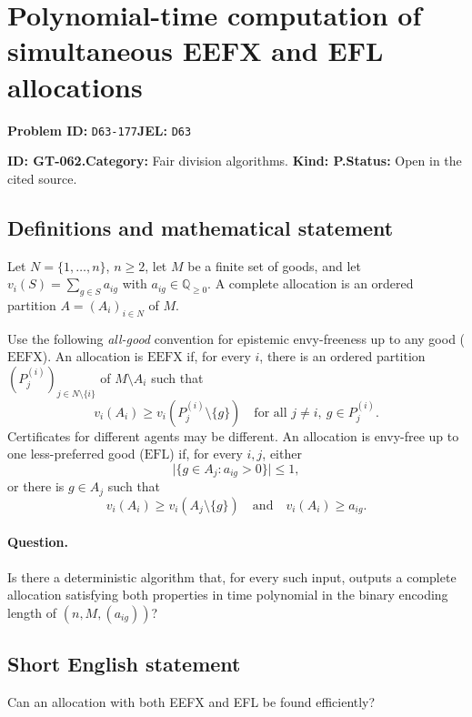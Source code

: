 \documentclass[11pt,a4paper]{article}
\begin{document}
\section*{Polynomial-time computation of simultaneous EEFX and EFL allocations}
\textbf{Problem ID:} \texttt{D63-177}\quad \textbf{JEL:} \texttt{D63}\par
\label{problem:OP-0192}
\label{game:GT-062}
{\sffamily\small\color{muted}
\noindent\textbf{ID: GT-062.}\quad\textbf{Category:} Fair division algorithms.
\quad\textbf{Kind: P.}\quad\textbf{Status:} Open in the cited source.
\par}
\subsection*{Definitions and mathematical statement}
Let \(N=\{1,\ldots,n\}\), \(n\geq 2\), let \(M\) be a finite set of goods,
and let \(v_i(S)=\sum_{g\in S}a_{ig}\) with
\(a_{ig}\in\mathbb Q_{\geq 0}\). A complete allocation is an ordered
partition \(A=(A_i)_{i\in N}\) of \(M\).

Use the following \emph{all-good} convention for epistemic envy-freeness
up to any good (\(\mathrm{EEFX}\)). An allocation is \(\mathrm{EEFX}\)
if, for every \(i\), there is an ordered partition
\((P^{(i)}_j)_{j\in N\setminus\{i\}}\) of \(M\setminus A_i\) such that
\[
 v_i(A_i)\geq v_i(P^{(i)}_j\setminus\{g\})
 \quad\text{for all }j\ne i,\ g\in P^{(i)}_j.
\]
Certificates for different agents may be different.
An allocation is envy-free up to one less-preferred good
(\(\mathrm{EFL}\)) if, for every \(i,j\), either
\[
 \bigl|\{g\in A_j:a_{ig}>0\}\bigr|\leq 1,
\]
or there is \(g\in A_j\) such that
\[
 v_i(A_i)\geq v_i(A_j\setminus\{g\})
 \quad\text{and}\quad
 v_i(A_i)\geq a_{ig}.
\]

\paragraph{Question.}
Is there a deterministic algorithm that, for every such input, outputs
a complete allocation satisfying both properties in time polynomial in
the binary encoding length of \((n,M,(a_{ig}))\)?

\subsection*{Short English statement}
Can an allocation with both EEFX and EFL be found efficiently?
\end{document}
